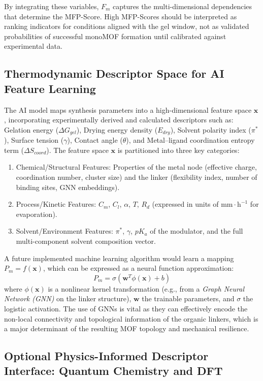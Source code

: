 \documentclass[12pt,a4paper]{article}
\begin{document}
By integrating these variables, $F_m$ captures the multi-dimensional dependencies that determine the MFP-Score. High MFP-Scores should be interpreted as ranking indicators for conditions aligned with the gel window, not as validated probabilities of successful monoMOF formation until calibrated against experimental data.

\subsection{Thermodynamic Descriptor Space for AI Feature Learning}

The AI model maps synthesis parameters into a high-dimensional feature space $\mathbf{x}$, incorporating experimentally derived and calculated descriptors such as: Gelation energy ($\Delta G_{gel}$), Drying energy density ($E_{dry}$), Solvent polarity index ($\pi^*$), Surface tension ($\gamma$), Contact angle ($\theta$), and Metal–ligand coordination entropy term ($\Delta S_{coord}$). The feature space $\mathbf{x}$ is partitioned into three key categories:
\begin{enumerate}
    \item Chemical/Structural Features: Properties of the metal node (effective charge, coordination number, cluster size) and the linker (flexibility index, number of binding sites, GNN embeddings).
    \item Process/Kinetic Features: $C_m$, $C_l$, $\alpha$, $T$, $R_d$ (expressed in units of $\text{mm} \cdot \text{h}^{-1}$ for evaporation).
    \item Solvent/Environment Features: $\pi^*$, $\gamma$, $pK_a$ of the modulator, and the full multi-component solvent composition vector.
\end{enumerate}
A future implemented machine learning algorithm would learn a mapping $P_m = f(\mathbf{x})$,\cite{ref13} which can be expressed as a neural function approximation:
\[
P_m = \sigma \left( \mathbf{w}^T \phi(\mathbf{x}) + b \right)
\]
where $\phi(\mathbf{x})$ is a nonlinear kernel transformation (e.g., from a \textit{Graph Neural Network (GNN)} on the linker structure), $\mathbf{w}$ the trainable parameters, and $\sigma$ the logistic activation. The use of GNNs is vital as they can effectively encode the non-local connectivity and topological information of the organic linkers, which is a major determinant of the resulting MOF topology and mechanical resilience.\cite{ref14}

\subsection{Optional Physics-Informed Descriptor Interface: Quantum Chemistry and DFT}
\end{document}

